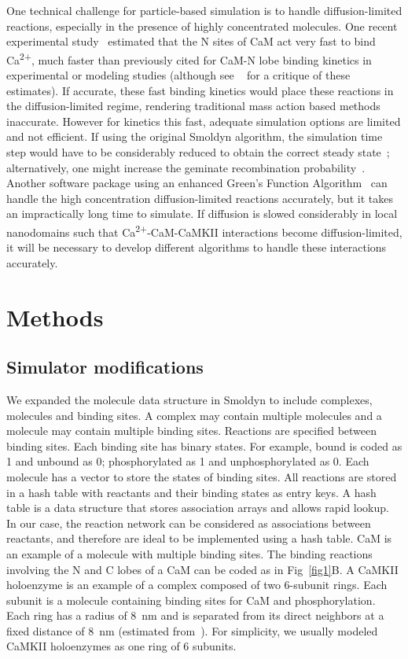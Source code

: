 \documentclass[10pt,letterpaper]{article}
\begin{document}
One technical challenge for particle-based simulation is to handle diffusion-limited reactions, especially in the presence of highly concentrated molecules. One recent experimental study~\cite{Faas:2011fna} estimated that the N sites of CaM act very fast to bind Ca\textsuperscript{2+}, much faster than previously cited for CaM-N lobe binding kinetics in experimental or modeling studies (although see ~\cite{Mironov:2013} for a critique of these estimates). If accurate, these fast binding kinetics would place these reactions in the diffusion-limited regime, rendering traditional mass action based methods inaccurate. 
However for kinetics this fast, adequate simulation options are limited and not efficient. If using the original Smoldyn algorithm, the simulation time step would have to be considerably reduced to obtain the correct steady state~\cite{Andrews:2015}; alternatively, one might increase the geminate recombination probability~\cite{Andrews:2004fs}. Another software package using an enhanced Green's Function Algorithm~\cite{vanZon:2005jd} can handle the high concentration diffusion-limited reactions accurately, but it takes an impractically long time to simulate. If diffusion is slowed considerably in local nanodomains such that Ca\textsuperscript{2+}-CaM-CaMKII interactions become diffusion-limited, it will be necessary to develop different algorithms to handle these interactions accurately.


\section*{Methods}
\subsection*{Simulator modifications}

We expanded the molecule data structure in Smoldyn to include complexes, molecules and binding sites. A complex may contain multiple molecules and a molecule may contain multiple binding sites. Reactions are specified between binding sites. Each binding site has binary states. For example, bound is coded as 1 and unbound as 0; phosphorylated as 1 and unphosphorylated as 0. Each molecule has a vector to store the states of binding sites. All reactions are stored in a hash table with reactants and their binding states as entry keys. A hash table is a data structure that stores association arrays and allows rapid lookup. In our case, the reaction network can be considered as associations between reactants, and therefore are ideal to be implemented using a hash table. CaM is an example of a molecule with multiple binding sites. The binding reactions involving the N and C lobes of a CaM can be coded as in Fig~\ref{fig1}B. A CaMKII holoenzyme is an example of a complex composed of two 6-subunit rings. Each subunit is a molecule containing binding sites for CaM and phosphorylation. Each ring has a radius of \SI{8}{\nm} and is separated from its direct neighbors at a fixed distance of \SI{8}{\nm} (estimated from~\cite{Gaertner:2004jk}). For simplicity, we usually modeled CaMKII holoenzymes as one ring of 6 subunits.
\end{document}
